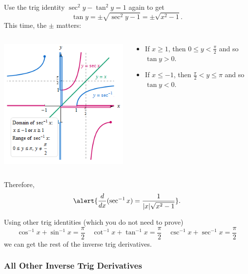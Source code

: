 \documentclass[cal1spr16Lectures.tex]{subfiles}
\begin{document}
\begin{frame}\footnotesize
Use the trig identity $\sec^2 y-\tan^2 y=1$ again to get 
\[\tan y=\pm\sqrt{\sec^2 y-1}=\pm\sqrt{x^2-1}.\]
This time, the $\pm$ matters:
\vspace{-1.1pc}
\begin{columns}
\begin{column}{0.3\textwidth}
	\begin{center}\includegraphics[scale=0.49]{pictures/invSecpic}\end{center}
\end{column}
\begin{column}{0.6\textwidth}
	\begin{itemize}
	\item If $x \ge 1$, then $0\leq y<\textstyle\frac{\pi}{2}$ and so $\tan y >0.$  
	\item If $x \le -1$, then $\textstyle\frac{\pi}{2} < y \leq \pi$ and so  $\tan y <0$.  
	\end{itemize}
\end{column}
\end{columns}	
\end{frame}

\begin{frame}\footnotesize
Therefore,
\[\alert{\frac{d}{dx}(\sec^{-1} x)=\frac{1}{|x|\sqrt{x^2-1}}}.\]
\hrulefill

Using other trig identities (which you do not need to prove)
\[\cos^{-1}x+\sin^{-1}x=\frac{\pi}{2}\quad \cot^{-1}x+\tan^{-1}x=\frac{\pi}{2}\quad \csc^{-1}x+\sec^{-1}x=\frac{\pi}{2}\] 
we can get the rest of the inverse trig derivatives. 
\end{frame}

\subsubsection{All Other Inverse Trig Derivatives}
\end{document}
